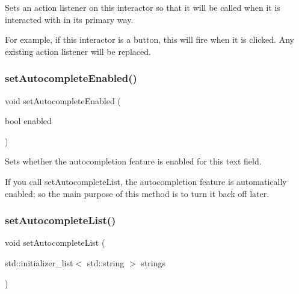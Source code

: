 Sets an action listener on this interactor so that it will be called when it is interacted with in its primary way. 

For example, if this interactor is a button, this will fire when it is clicked. Any existing action listener will be replaced. \mbox{\label{classGTextField_a173f724f6099be5a2ed423baf3433b83}} 
\subsubsection{\texorpdfstring{set\+Autocomplete\+Enabled()}{setAutocompleteEnabled()}}
{\footnotesize\ttfamily void set\+Autocomplete\+Enabled (\begin{DoxyParamCaption}\item[{bool}]{enabled }\end{DoxyParamCaption})\hspace{0.3cm}{\ttfamily [virtual]}}



Sets whether the autocompletion feature is enabled for this text field. 

If you call set\+Autocomplete\+List, the autocompletion feature is automatically enabled; so the main purpose of this method is to turn it back off later. \mbox{\label{classGTextField_ab0245df51aa762af89f0d2cf31ce6ddd}} 
\subsubsection{\texorpdfstring{set\+Autocomplete\+List()}{setAutocompleteList()}\hspace{0.1cm}{\footnotesize\ttfamily [1/2]}}
{\footnotesize\ttfamily void set\+Autocomplete\+List (\begin{DoxyParamCaption}\item[{std\+::initializer\+\_\+list$<$ std\+::string $>$}]{strings }\end{DoxyParamCaption})\hspace{0.3cm}{\ttfamily [virtual]}}



